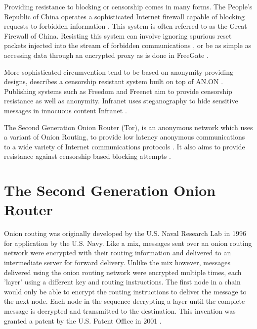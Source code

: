 \documentclass{ecuthesis}
\begin{document}
Providing resistance to blocking or censorship comes in many forms. The People's
Republic of China operates a sophisticated Internet firewall capable of blocking
requests to forbidden information \parencite{The-OpenNet-Initiative:2009uq}.
This system is often referred to as the Great Firewall of China. Resisting this
system can involve ignoring spurious reset packets injected into the stream of
forbidden communications \parencite{springerlink:10.1007/11957454-2}, or be as
simple as accessing data through an encrypted proxy as is done in FreeGate
\parencite{Smart:2008kx}.

More sophisticated circumvention tend to be based on anonymity providing
designs, \textcite{Kopsell:2004:ABR:1029179.1029197} describes a censorship
resistant system built on top of AN.ON
\parencite{springerlink:10.1007/3-540-44702-4-7}. Publishing systems such as
Freedom \parencite{Goldberg:1999p2231} and Freenet \parencite{Clarke:2001p2435}
aim to provide censorship resistance as well as anonymity. Infranet uses
steganography to hide sensitive messages in innocuous content Infranet
\parencite{Feamster:2002p307}.

The Second Generation Onion Router (Tor), is an anonymous network which uses a
variant of Onion Routing, to provide low latency anonymous communications to a
wide variety of Internet communications protocols
\parencite{Dingledine:2004p314}. It also aims to provide resistance against
censorship based blocking attempts \parencite{Dingledine:2008p1542}.

\section{The Second Generation Onion Router}

Onion routing was originally developed by the U.S. Naval Research Lab in 1996
\parencite{Goldschlag:1996wy} for application by the U.S. Navy. Like a mix,
messages sent over an onion routing network were encrypted with their routing
information and delivered to an intermediate server for forward delivery.
Unlike the mix however, messages delivered using the onion routing network were
encrypted multiple times, each 'layer' using a different key and routing
instructions. The first node in a chain would only be able to encrypt the
routing instructions to deliver the message to the next node. Each node in the
sequence decrypting a layer until the complete message is decrypted and
transmitted to the destination. This invention was granted a patent by the U.S.
Patent Office in 2001 \parencite{Michael:2001}.
\end{document}
